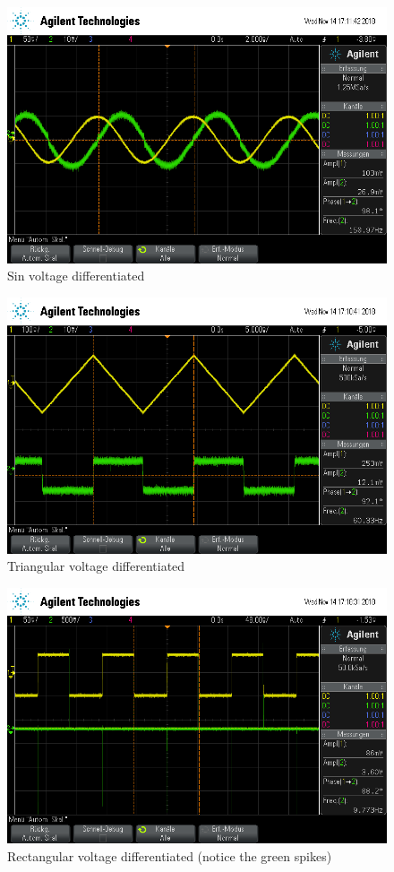 \begin{figure}[H]
\centering
\includegraphics[scale=.48]{V51Bilder/diffSin.png}
\caption{Sin voltage differentiated}\label{fig:diff1}
\end{figure}
\begin{figure}[H]
\centering
\includegraphics[scale=.48]{V51Bilder/diffTri.png}
\caption{Triangular voltage differentiated}\label{fig:diff2}
\end{figure}
\begin{figure}[H]
\centering
\includegraphics[scale=.48]{V51Bilder/diffRect.png}
\caption{Rectangular voltage differentiated (notice the green spikes)}\label{fig:diff3}
\end{figure}


